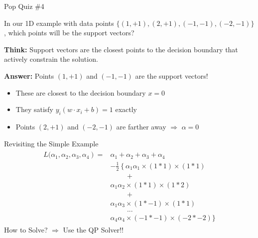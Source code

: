 \documentclass{beamer}
\begin{document}
\begin{frame}{Pop Quiz \#4}
\begin{tcolorbox}[colback=blue!5!white,colframe=blue!75!black,title=Support Vector Challenge!]
In our 1D example with data points $\{(1,+1), (2,+1), (-1,-1), (-2,-1)\}$, which points will be the support vectors?

\pause
\textbf{Think:} Support vectors are the closest points to the decision boundary that actively constrain the solution.

\pause
\textbf{Answer:} Points $(1,+1)$ and $(-1,-1)$ are the support vectors!
\begin{itemize}
	\item These are closest to the decision boundary $x = 0$
	\item They satisfy $y_i(w \cdot x_i + b) = 1$ exactly
	\item Points $(2,+1)$ and $(-2,-1)$ are farther away $\Rightarrow$ $\alpha = 0$
\end{itemize}
\end{tcolorbox}
\end{frame}

\begin{frame}{Revisiting the Simple Example}
\begin{align*}
\begin{aligned}
\left.L(\alpha_{1},\alpha_{2},\alpha_{3},\alpha_{4}\right)=& \alpha_{1}+\alpha_{2}+\alpha_{3}+\alpha_{4} \\
&-\frac{1}{2}\left\{\alpha_{1} \alpha_{1}\times(1*1) \times(1 * 1)\right.\\
&\hspace{1cm} + \\
& \alpha_{1} \alpha_{2} \times(1*1) \times(1*2) \\
&\hspace{1cm}+\\
& \alpha_{1} \alpha_{3} \times(1*-1)\times(1*1)\\
& \hspace{1cm} ... \\
& \alpha_4\alpha_4 \times(-1*-1)\times(-2*-2)
\}
\end{aligned}
\end{align*}
How to Solve? $\Rightarrow$ Use the QP Solver!!
\end{frame}
\end{document}
